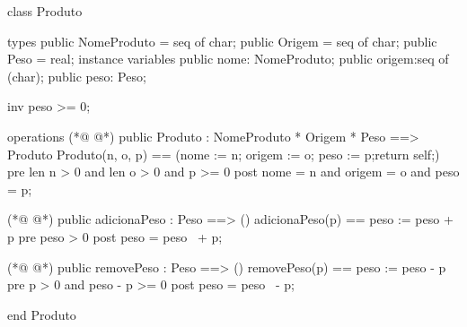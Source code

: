 \begin{vdmpp}[breaklines=true]
class Produto

types
 public NomeProduto = seq of char;
 public Origem = seq of char;
 public Peso = real;
instance variables
  public nome: NomeProduto;
  public origem:seq of (char);
  public peso: Peso;
  
  inv peso >= 0;

operations
(*@
\label{Produto:15}
@*)
  public  Produto : NomeProduto * Origem * Peso ==> Produto
  Produto(n, o, p) == (nome := n; origem := o; peso := p;return self;)
  pre len n > 0 and len o > 0 and p >= 0
  post nome = n and origem = o and peso = p;

(*@
\label{adicionaPeso:20}
@*)
  public  adicionaPeso : Peso ==> ()
  adicionaPeso(p) == peso := peso + p
  pre peso > 0
  post peso = peso~ + p;
  

(*@
\label{removePeso:26}
@*)
  public  removePeso : Peso ==> ()
  removePeso(p) == peso := peso - p
  pre p > 0 and peso - p >= 0
  post peso = peso~ - p;


end Produto
\end{vdmpp}
